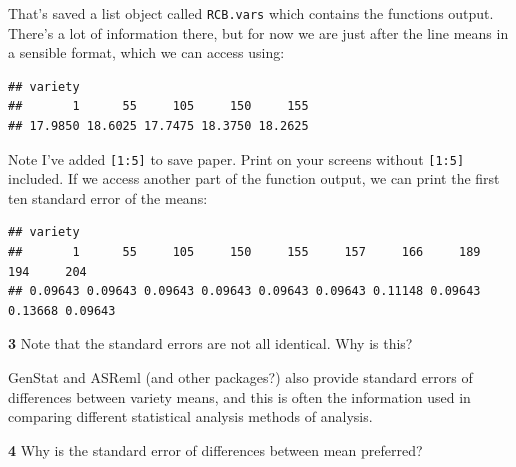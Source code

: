 \documentclass[
]{book}
\makeatletter
\newenvironment{Shaded}{\begin{snugshade}}{\end{snugshade}}
\newcommand{\AttributeTok}[1]{\textcolor[rgb]{0.77,0.63,0.00}{#1}}
\newcommand{\DecValTok}[1]{\textcolor[rgb]{0.00,0.00,0.81}{#1}}
\newcommand{\NormalTok}[1]{#1}
\newcommand{\SpecialCharTok}[1]{\textcolor[rgb]{0.00,0.00,0.00}{#1}}
\newcommand{\StringTok}[1]{\textcolor[rgb]{0.31,0.60,0.02}{#1}}
\newenvironment{kframe}{%
\medskip{}
\setlength{\fboxsep}{.8em}
 \def\at@end@of@kframe{}%
 \ifinner\ifhmode%
  \def\at@end@of@kframe{\end{minipage}}%
  \begin{minipage}{\columnwidth}%
 \fi\fi%
 \def\FrameCommand##1{\hskip\@totalleftmargin \hskip-\fboxsep
 \colorbox{shadecolor}{##1}\hskip-\fboxsep
     \hskip-\linewidth \hskip-\@totalleftmargin \hskip\columnwidth}%
 \MakeFramed {\advance\hsize-\width
   \@totalleftmargin\z@ \linewidth\hsize
   \@setminipage}}%
 {\par\unskip\endMakeFramed%
 \at@end@of@kframe}
\newenvironment{rmdblock}[1]
  {
  \begin{itemize}
  \renewcommand{\labelitemi}{
    \raisebox{-.7\height}[0pt][0pt]{
      {\setkeys{Gin}{width=3em,keepaspectratio}\texttt{[image: images/\#1]}}
    }
  }
  \setlength{\fboxsep}{1em}
  \begin{kframe}
  \item
  }
  {
  \end{kframe}
  \end{itemize}
  }
\newenvironment{rmdquiz}
  {\begin{rmdblock}{quiz}}
  {\end{rmdblock}}
\makeatother
\begin{document}
That's saved a list object called \texttt{RCB.vars} which contains the functions output. There's a lot of information there, but for now we are just after the line means in a sensible format, which we can access using:

\begin{Shaded}
\end{Shaded}

\begin{verbatim}
## variety
##       1      55     105     150     155 
## 17.9850 18.6025 17.7475 18.3750 18.2625
\end{verbatim}

Note I've added \texttt{{[}1:5{]}} to save paper. Print on your screens without \texttt{{[}1:5{]}} included. If we access another part of the function output, we can print the first ten standard error of the means:

\begin{Shaded}
\end{Shaded}

\begin{verbatim}
## variety
##       1      55     105     150     155     157     166     189     194     204 
## 0.09643 0.09643 0.09643 0.09643 0.09643 0.09643 0.11148 0.09643 0.13668 0.09643
\end{verbatim}

\begin{rmdquiz}
\textbf{3} Note that the standard errors are not all identical. Why is this?
\end{rmdquiz}

GenStat and ASReml (and other packages?) also provide standard errors of differences between variety means, and this is often the information used in comparing different statistical analysis methods of analysis.

\begin{rmdquiz}
\textbf{4} Why is the standard error of differences between mean preferred?
\end{rmdquiz}
\end{document}
